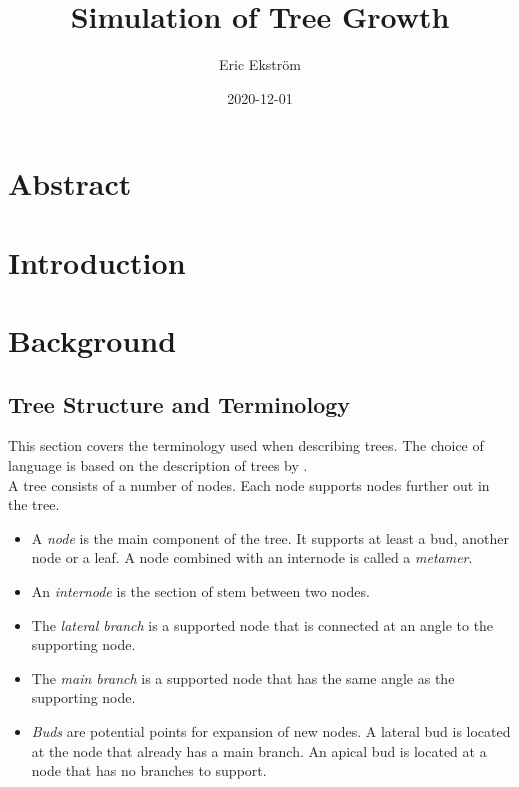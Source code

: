 \documentclass{article}
\title{Simulation of Tree Growth}
\date{2020-12-01}
\author{Eric Ekström}
\begin{document}
	
	\maketitle
	\newpage
  	
  	\section*{Abstract}
  	
  	\newpage
  	\tableofcontents
  	\newpage

  	\section{Introduction}
  		 
  	\section{Background}
  		
  		
  		\subsection{Tree Structure and Terminology}
  			This section covers the terminology used when describing trees. The choice of language is based on the description of trees by \citep{barthelemy2007plant}. \\
  			
  			A tree consists of a number of nodes. Each node supports nodes further out in the tree.
  			
  			\begin{itemize}
  				\item A \textit{node} is the main component of the tree. It supports at least a bud, another node or a leaf. A node combined with an internode is called a \textit{metamer}. \citep{barthelemy2007plant}
  				\item An \textit{internode} is the section of stem between two nodes.
  				\item The \textit{lateral branch} is a supported node that is connected at an angle  to the supporting node.
  				\item The \textit{main branch} is a supported node that has the same angle as the supporting node.
  				\item \textit{Buds} are potential points for expansion of new nodes. A lateral bud is located at the node that already has a main branch. An apical bud is located at a node that has no branches to support.
  				
  			\end{itemize}
  			
\end{document}
